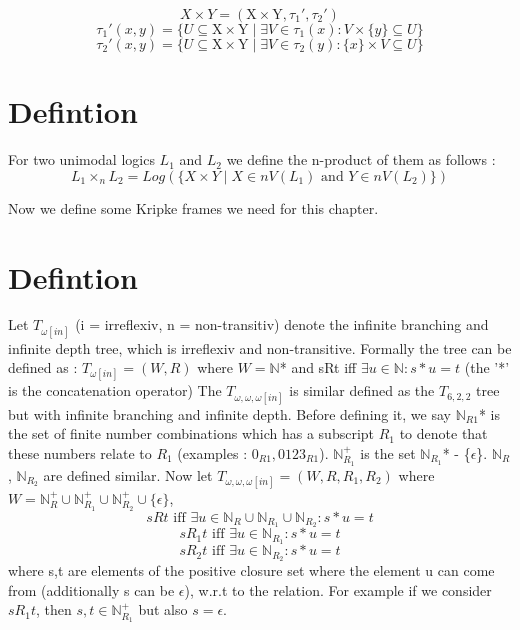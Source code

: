 \documentclass[12pt, a4paper]{scrreprt}
\begin{document}
$$ X \times Y = (\mbox{X} \times \mbox{Y}, \tau_1', \tau_2')$$   
$$ \tau_1'(x,y) = \{ U \subseteq \mbox{X} \times \mbox{Y} \mid \exists V \in \tau_1(x) : V \times  \{ y \} \subseteq U \}$$
$$ \tau_2'(x,y) = \{ U \subseteq \mbox{X} \times \mbox{Y} \mid \exists V \in \tau_2(y) : \{ x \} \times V \subseteq U \}$$

\section {Defintion}

For two unimodal logics $L_1$ and $L_2$ we define the n-product of them as follows :
$$ L_1 \times_n L_2 = Log(\{ X \times Y \mid X \in nV(L_1) \mbox{ and } Y \in nV(L_2) \})$$

Now we define some Kripke frames we need for this chapter.


\section{Defintion}
Let $T_{\omega [in]}$ (i = irreflexiv, n = non-transitiv) denote the infinite branching and infinite depth tree, which is irreflexiv and non-transitive.
Formally the tree can be defined as : $T_{\omega [in]} = (W, R)$ where $W = \mathbb{N}$* and sRt iff $\exists u \in \mathbb{N} : s*u = t$ (the '*' is the concatenation operator) \newline \newline
The $T_{\omega,\omega,\omega [in]}$ is similar defined as the $T_{6,2,2}$ tree but with infinite branching and infinite depth. Before defining it, we say
$\mathbb{N}_{R1}$* is the set of finite number combinations which has a subscript $R_1$ to denote that these numbers relate to $R_1$ (examples : $0_{R1}, 0123_{R1}$).
$\mathbb{N}^+_{R_1}$ is the set $\mathbb{N}_{R_1}$* - \{$\epsilon$\}. $\mathbb{N}_{R}$, $\mathbb{N}_{R_2}$ are defined similar. \newline
Now let $T_{\omega,\omega,\omega [in]} = (W, R, R_1, R_2 )$ where $W = \mathbb{N}^+_{R} \cup \mathbb{N}^+_{R_1} \cup \mathbb{N}^+_{R_2} \cup \{ \epsilon\}$, 
$$sRt \mbox{ iff } \exists u \in \mathbb{N}_{R} \cup \mathbb{N}_{R_1} \cup \mathbb{N}_{R_2} : s*u = t$$
$$sR_1t \mbox { iff } \exists u \in \mathbb{N}_{R_1} : s * u = t$$
$$sR_2t \mbox { iff } \exists u \in \mathbb{N}_{R_2} : s * u = t$$
where s,t are elements of the positive closure set where the element u can come from (additionally s can be $\epsilon$), w.r.t to the relation. For example
if we consider $sR_1t$, then $s,t \in \mathbb{N}^+_{R_1}$ but also $s = \epsilon$.
\end{document}
